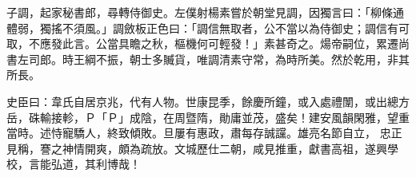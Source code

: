 \begin{pinyinscope}
 子調，起家秘書郎，尋轉侍御史。左僕射楊素嘗於朝堂見調，因獨言曰：「柳條通體弱，獨搖不須風。」調斂板正色曰：「調信無取者，公不當以為侍御史；調信有可取，不應發此言。公當具瞻之秋，樞機何可輕發！」素甚奇之。煬帝嗣位，累遷尚書左司郎。時王綱不振，朝士多贓貨，唯調清素守常，為時所美。然於乾用，非其所長。



 史臣曰：韋氏自居京兆，代有人物。世康昆季，餘慶所鐘，或入處禮闈，或出總方岳，硃輸接軫，Ｐ「Ｐ」成陰，在周暨隋，勛庸並茂，盛矣！建安風韻閑雅，望重當時。述恃寵驕人，終致傾敗。旦屢有惠政，肅每存誠讜。雄亮名節自立，
 忠正見稱，謇之神情開爽，頗為疏放。文城歷仕二朝，咸見推重，獻書高祖，遂興學校，言能弘道，其利博哉！



\end{pinyinscope}